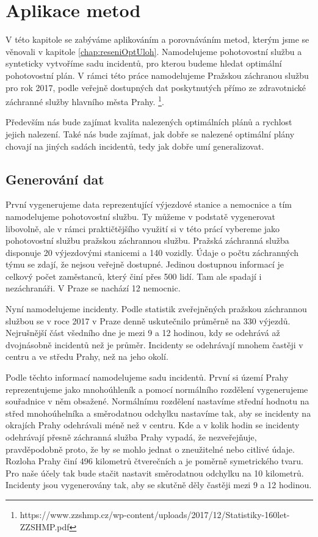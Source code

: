 \chapter{Aplikace metod}

V této kapitole se zabýváme aplikováním a porovnáváním metod, kterým jsme se věnovali v kapitole \ref{chap:reseniOptUloh}.
Namodelujeme pohotovostní službu a synteticky vytvoříme sadu incidentů, pro kterou budeme hledat optimální pohotovostní plán.
V rámci této práce namodelujeme Pražskou záchranou službu pro rok 2017, podle veřejně dostupných dat
poskytnutých přímo ze zdravotnické záchranné služby hlavního města Prahy.
\footnote{https://www.zzshmp.cz/wp-content/uploads/2017/12/Statistiky-160let-ZZSHMP.pdf}.

Především nás bude zajímat kvalita nalezených optimálních plánů a rychlost jejich nalezení.
Také nás bude zajímat, jak dobře se nalezené optimální plány chovají na jiných sadách incidentů, tedy jak dobře umí generalizovat.

\section{Generování dat}

První vygenerujeme data reprezentující výjezdové stanice a nemocnice a tím namodelujeme pohotovostní službu.
Ty můžeme v podstatě vygenerovat libovolně, ale v rámci praktičtějšího využití
si v této prácí vybereme jako pohotovostní službu pražskou záchrannou službu.
Pražská záchranná služba disponuje 20 výjezdovými stanicemi a 140 vozidly.
Údaje o počtu záchranných týmu se zdají, že nejsou veřejně dostupné. Jedinou dostupnou informací je celkový počet zaměstanců, který činí přes 500 lidí.
Tam ale spadají i nezáchranáři.
V Praze se nachází 12 nemocnic.

Nyní namodelujeme incidenty. Podle statistik zveřejněných pražskou záchrannou službou se v roce 2017 v Praze denně uskutečnilo průměrně na 330 výjezdů.
Nejrušnější část všedního dne je mezi 9 a 12 hodinou, kdy se odehrává až dvojnásobně incidentů než je průměr.
Incidenty se odehrávají mnohem častěji v centru a ve středu Prahy, než na jeho okolí.

Podle těchto informací namodelujeme sadu incidentů.
První si území Prahy reprezentujeme jako mnohoúhleník a pomocí normálního rozdělení vygenerujeme souřadnice v něm obsažené.
Normálnímu rozdělení nastavíme střední hodnotu na střed mnohoúhelníka a směrodatnou odchylku nastavíme tak, aby se incidenty na okrajích Prahy odehrávali méně než v centru. 
Kde a v kolik hodin se incidenty odehrávají přesně záchranná služba Prahy vypadá, že nezveřejňuje, pravděpodobně proto, že by se mohlo jednat o zneužitelné nebo citlivé údaje.
Rozloha Prahy činí 496 kilometrů čtverečních a je poměrně symetrického tvaru. Pro naše účely tak bude stačit nastavit směrodatnou odchylku na 10 kilometrů.
Incidenty jsou vygenerovány tak, aby se skutčně děly častěji mezi 9 a 12 hodinou.

